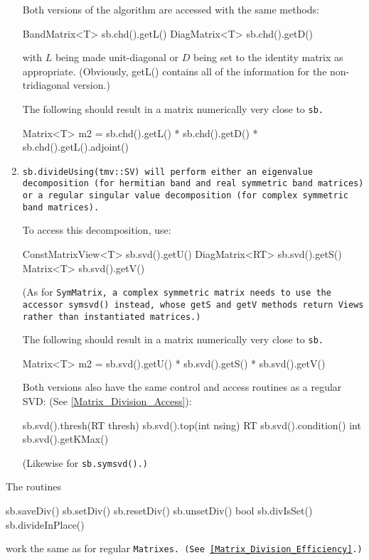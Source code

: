 \begin{enumerate}
Both versions of the algorithm are accessed with the same methods:
\begin{tmvcode}
BandMatrix<T> sb.chd().getL()
DiagMatrix<T> sb.chd().getD()
\end{tmvcode}
with $L$ being made unit-diagonal or $D$ being set to the identity matrix
as appropriate.  (Obviously, getL() contains all of the information for the non-tridiagonal
version.)

The following should result in a matrix numerically very close to \tt{sb}.
\begin{tmvcode}
Matrix<T> m2 = sb.chd().getL() * sb.chd().getD() * 
      sb.chd().getL().adjoint()
\end{tmvcode}

\item
\tt{sb.divideUsing(tmv::SV)} will perform either an eigenvalue decomposition
(for hermitian band and real symmetric band matrices) or a regular singular value
decomposition (for complex symmetric band matrices).

To access this decomposition, use:
\begin{tmvcode}
ConstMatrixView<T> sb.svd().getU()
DiagMatrix<RT> sb.svd().getS()
Matrix<T> sb.svd().getV()
\end{tmvcode}
(As for \tt{SymMatrix}, a complex symmetric matrix needs to use the accessor
\tt{symsvd()} instead, whose \tt{getS} and \tt{getV} methods return Views
rather than instantiated matrices.)

The following should result in a matrix numerically very close to \tt{sb}.
\begin{tmvcode}
Matrix<T> m2 = sb.svd().getU() * sb.svd().getS() * sb.svd().getV()
\end{tmvcode}

Both versions also have the same control and access routines as a regular SVD:
(See \ref{Matrix_Division_Access}):
\begin{tmvcode}
sb.svd().thresh(RT thresh)
sb.svd().top(int nsing)
RT sb.svd().condition()
int sb.svd().getKMax()
\end{tmvcode}
(Likewise for \tt{sb.symsvd()}.)

\end{enumerate}
The routines 
\begin{tmvcode}
sb.saveDiv()
sb.setDiv()
sb.resetDiv()
sb.unsetDiv()
bool sb.divIsSet()
sb.divideInPlace()
\end{tmvcode}
work the same as for regular \tt{Matrix}es.
(See \ref{Matrix_Division_Efficiency}.)

